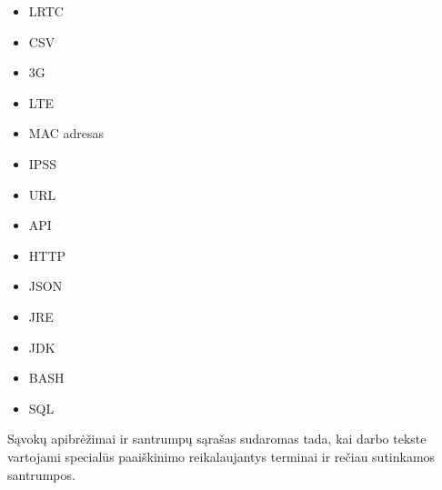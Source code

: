 \documentclass{VUMIFPSbakalaurinis}
\begin{document}
\begin{itemize}
	\item LRTC
	\item CSV
	\item 3G
	\item LTE
	\item MAC adresas
	\item IPSS
	\item URL
	\item API
	\item HTTP
	\item JSON
	\item JRE
	\item JDK
	\item BASH
	\item SQL
\end{itemize}
Sąvokų apibrėžimai ir santrumpų sąrašas sudaromas tada, kai darbo tekste
vartojami specialūs paaiškinimo reikalaujantys terminai ir rečiau sutinkamos
santrumpos.

\appendix  %
\end{document}
